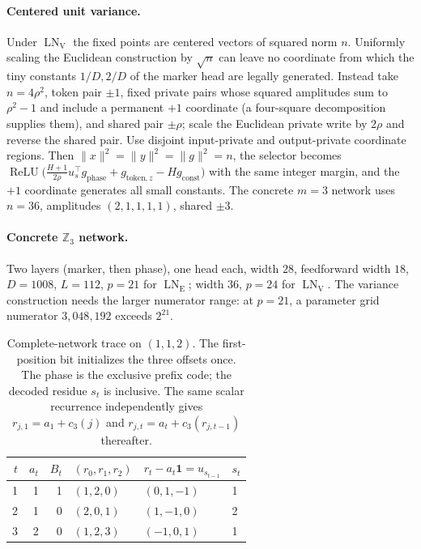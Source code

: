 \documentclass[10pt]{article}
\theoremstyle{remark}
\newcommand{\Z}{\mathbb Z}
\newcommand{\LN}{\operatorname{LN}}
\newcommand{\relu}{\operatorname{ReLU}}
\begin{document}
\paragraph{Centered unit variance.} Under $\LN_{\mathrm V}$ the fixed points are centered vectors of squared norm $n$. Uniformly scaling the Euclidean construction by $\sqrt n$ can leave no coordinate from which the tiny constants $1/D,2/D$ of the marker head are legally generated. Instead take $n=4\rho^2$, token pair $\pm1$, fixed private pairs whose squared amplitudes sum to $\rho^2-1$ and include a permanent $+1$ coordinate (a four-square decomposition supplies them), and shared pair $\pm\rho$; scale the Euclidean private write by $2\rho$ and reverse the shared pair. Use disjoint input-private and output-private coordinate regions. Then
$\|x\|^2=\|y\|^2=\|g\|^2=n$, the selector becomes $\relu\big(\tfrac{H+1}{2\rho}u_s^\top g_{\mathrm{phase}}+g_{\mathrm{token},z}-Hg_{\mathrm{const}}\big)$ with the same integer margin, and the $+1$ coordinate generates all small constants. The concrete $m=3$ network uses $n=36$, amplitudes $(2,1,1,1,1)$, shared $\pm3$.

\paragraph{Concrete $\Z_3$ network.} Two layers (marker, then phase), one head each, width $28$, feedforward width $18$, $D=1008$, $L=112$, $p=21$ for $\LN_{\mathrm E}$; width $36$, $p=24$ for $\LN_{\mathrm V}$. The variance construction needs the larger numerator range: at $p=21$,
a parameter grid numerator $3{,}048{,}192$ exceeds $2^{21}$.

\begin{table}[t]
\centering
\small
\begin{tabular}{@{}rrrlll@{}}
\toprule
$t$ & $a_t$ & $B_t$ & $(r_0,r_1,r_2)$ & $r_t-a_t\mathbf1=u_{s_{t-1}}$ & $s_t$ \\
\midrule
1 & 1 & 1 & $(1,2,0)$ & $(0,1,-1)$ & 1 \\
2 & 1 & 0 & $(2,0,1)$ & $(1,-1,0)$ & 2 \\
3 & 2 & 0 & $(1,2,3)$ & $(-1,0,1)$ & 1 \\
\bottomrule
\end{tabular}
\caption{Complete-network trace on $(1,1,2)$. The first-position bit initializes
the three offsets once. The phase is the exclusive prefix code; the decoded
residue $s_t$ is inclusive. The same scalar recurrence independently gives
$r_{j,1}=a_1+c_3(j)$ and $r_{j,t}=a_t+c_3(r_{j,t-1})$ thereafter.}
\label{tab:example}
\end{table}
\end{document}
